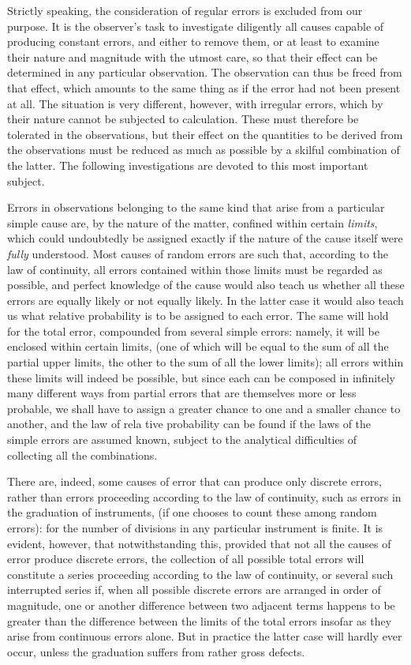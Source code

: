 Strictly speaking, the consideration of regular errors is excluded from our purpose. It is the observer's task to investigate diligently all causes capable of producing constant errors, and either to remove them, or at least to examine their nature and magnitude with the utmost care, so that their effect can be determined in any particular observation. The observation can thus be freed from that effect, which amounts to the same thing as if the error had not been present at all. The situation is very different, however, with irregular errors, which by their nature cannot be subjected to calculation. These must therefore be tolerated in the observations, but their effect on the quantities to be derived from the observations must be reduced as much as possible by a skilful combination of the latter. The following investigations are devoted to this most important subject.

Errors in observations belonging to the same kind that arise from a particular simple cause are, by the nature of the matter, confined within certain \textit{limits}, which could undoubtedly be assigned exactly if the nature of the cause itself were \textit{fully} understood. Most causes of random errors are such that, according to the law of continuity, all errors contained within those limits must be regarded as possible, and perfect knowledge of the cause would also teach us whether all these errors are equally likely or not equally likely. In the latter case it would also teach us what relative probability is to be assigned to each error. The same will hold for the total error, compounded from several simple errors: namely, it will be enclosed within certain limits, (one of which will be equal to the sum of all the partial upper limits, the other to the sum of all the lower limits); all errors within these limits will indeed be possible, but since each can be composed in infinitely many different ways from partial errors that are themselves more or less probable, we shall have to assign a greater chance to one and a smaller chance to another, and the law of rela%
tive probability can be found if the laws of the simple errors are assumed known, subject to the analytical difficulties of collecting all the combinations.

There are, indeed, some causes of error that can produce only discrete errors, rather than errors proceeding according to the law of continuity, such as errors in the graduation of instruments, (if one chooses to count these among random errors): for the number of divisions in any particular instrument is finite. It is evident, however, that notwithstanding this, provided that not all the causes of error produce discrete errors, the collection of all possible total errors will constitute a series proceeding according to the law of continuity, or several such interrupted series if, when all possible discrete errors are arranged in order of magnitude, one or another difference between two adjacent terms happens to be greater than the difference between the limits of the total errors insofar as they arise from continuous errors alone. But in practice the latter case will hardly ever occur, unless the graduation suffers from rather gross defects.

\clearpage
